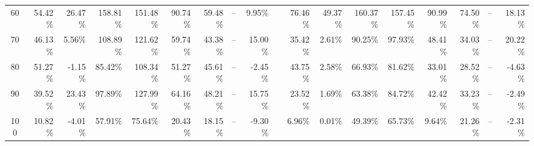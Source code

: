 \begin{table}[h!]
{\begin{tabular}{c rrrrrrrr c rrrrrrrr}
60 & 54.42\% & 26.47\% & 158.81\% & 151.48\% & 90.74\% & 59.48\% & -- & 9.95\% &  & 76.46\% & 49.37\% & 160.37\% & 157.45\% & 90.99\% & 74.50\% & -- & 18.13\% \\
70 & 46.13\% & 5.56\% & 108.89\% & 121.62\% & 59.74\% & 43.38\% & -- & 15.00\% &  & 35.42\% & 2.61\% & 90.25\% & 97.93\% & 48.41\% & 34.03\% & -- & 20.22\% \\
80 & 51.27\% & -1.15\% & 85.42\% & 108.34\% & 51.27\% & 45.61\% & -- & -2.45\% &  & 43.75\% & 2.58\% & 66.93\% & 81.62\% & 33.01\% & 28.52\% & -- & -4.63\% \\
90 & 39.52\% & 23.43\% & 97.89\% & 127.99\% & 64.16\% & 48.21\% & -- & 15.75\% &  & 23.52\% & 1.69\% & 63.38\% & 84.72\% & 42.42\% & 33.23\% & -- & -2.49\% \\
100 & 10.82\% & -4.01\% & 57.91\% & 75.64\% & 20.43\% & 18.15\% & -- & -9.30\% &  & 6.96\% & 0.01\% & 49.39\% & 65.73\% & 9.64\% & 21.26\% & -- & -2.31\% \\
\bottomrule
\end{tabular}%
}
\endgroup
\end{table}
